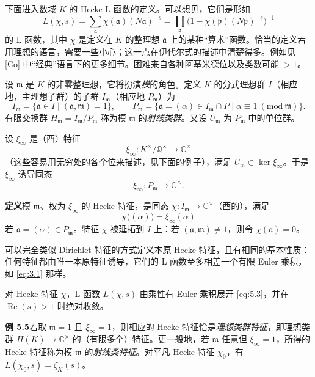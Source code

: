 下面进入数域 $K$ 的 Hecke L 函数的定义。可以想见，它们是形如
\begin{equation}\tag{5.3}\label{eq:5.3}
L(\chi,s)=\sum_{\mathfrak{a}}\chi(\mathfrak{a})(N\mathfrak{a})^{-s}
=\prod_{\mathfrak{p}}\bigl(1-\chi(\mathfrak{p})(N\mathfrak{p})^{-s}\bigr)^{-1}
\end{equation}
的 L 函数，其中 $\chi$ 是定义在 $K$ 的整理想 $\mathfrak{a}$ 上的某种“算术”函数。恰当的定义若用理想的语言，需要一些小心；这一点在伊代尔式的描述中清楚得多。例如见 [Co] 中“经典”语言下的更多细节。困难来自各种阿基米德位以及类数可能 $>1$。

设 $\mathfrak{m}$ 是 $K$ 的非零整理想，它将扮演\emph{模}的角色。定义 $K$ 的分式理想群 $I$（相应地，主理想子群）的子群 $I_{\mathfrak{m}}$（相应地 $P_{\mathfrak{m}}$）为
\[
I_{\mathfrak{m}}=\{\mathfrak{a}\in I\mid(\mathfrak{a},\mathfrak{m})=1\},\qquad
P_{\mathfrak{m}}=\{\mathfrak{a}=(\alpha)\in I_{\mathfrak{m}}\cap P\mid
\alpha\equiv 1\ (\mathrm{mod}\ \mathfrak{m})\}.
\]
有限交换群 $H_{\mathfrak{m}}=I_{\mathfrak{m}}/P_{\mathfrak{m}}$ 称为模 $\mathfrak{m}$ 的\emph{射线类群}。又设 $U_{\mathfrak{m}}$ 为 $P_{\mathfrak{m}}$ 中的单位群。

设 $\xi_{\infty}$ 是（酉）特征
\[
\xi_{\infty}\colon K^{\times}/\mathbb{Q}^{\times}\to\mathbb{C}^{\times}
\]
（这些容易用无穷处的各个位来描述，见下面的例子），满足 $U_{\mathfrak{m}}\subset\ker\xi_{\infty}$。于是 $\xi_{\infty}$ 诱导同态
\[
\xi_{\infty}\colon P_{\mathfrak{m}}\to\mathbb{C}^{\times}.
\]

\par\medskip\noindent\textbf{定义}\quad 模 $\mathfrak{m}$、权为 $\xi_{\infty}$ 的 Hecke 特征，是同态 $\chi\colon I_{\mathfrak{m}}\to\mathbb{C}^{\times}$（酉的），满足
\[
\chi\bigl((\alpha)\bigr)=\xi_{\infty}(\alpha)
\]
若 $\mathfrak{a}=(\alpha)\in P_{\mathfrak{m}}$。特征 $\chi$ 被延拓到 $I$ 上：若 $(\mathfrak{a},\mathfrak{m})\neq 1$，则令 $\chi(\mathfrak{a})=0$。

可以完全类似 Dirichlet 特征的方式定义本原 Hecke 特征，且有相同的基本性质：任何特征都由唯一本原特征诱导，它们的 L 函数至多相差一个有限 Euler 乘积，如 \eqref{eq:3.1} 那样。

对 Hecke 特征 $\chi$，L 函数 $L(\chi,s)$ 由乘性有 Euler 乘积展开 \eqref{eq:5.3}，并在 $\operatorname{Re}(s)>1$ 时绝对收敛。

\par\medskip\noindent\textbf{例 5.5}\quad 若取 $\mathfrak{m}=1$ 且 $\xi_{\infty}=1$，则相应的 Hecke 特征恰是\emph{理想类群特征}，即理想类群 $H(K)\to\mathbb{C}^{\times}$ 的（有限多个）特征。更一般地，若 $\mathfrak{m}$ 任意但 $\xi_{\infty}=1$，所得的 Hecke 特征称为模 $\mathfrak{m}$ 的\emph{射线类特征}。对平凡 Hecke 特征 $\chi_0$，有 $L(\chi_0,s)=\zeta_K(s)$。

